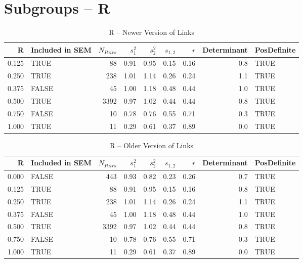 \documentclass{article}\usepackage{graphicx, color}
\begin{document}
\section{Subgroups --  R }%
\begin{table}[ht]
\begin{center}
\begin{tabular}{rlrrrrrrl}
  \hline
R & Included in SEM & $N_{Pairs}$ & $s_1^2$ & $s_2^2$ & $s_{1,2}$ & $r$ & Determinant & PosDefinite \\ 
  \hline
0.125 & TRUE & 88 & 0.91 & 0.95 & 0.15 & 0.16 & 0.8 & TRUE \\ 
  0.250 & TRUE & 238 & 1.01 & 1.14 & 0.26 & 0.24 & 1.1 & TRUE \\ 
  0.375 & FALSE & 45 & 1.00 & 1.18 & 0.48 & 0.44 & 1.0 & TRUE \\ 
  0.500 & TRUE & 3392 & 0.97 & 1.02 & 0.44 & 0.44 & 0.8 & TRUE \\ 
  0.750 & FALSE & 10 & 0.78 & 0.76 & 0.55 & 0.71 & 0.3 & TRUE \\ 
  1.000 & TRUE & 11 & 0.29 & 0.61 & 0.37 & 0.89 & 0.0 & TRUE \\ 
   \hline
\end{tabular}
\caption{R -- Newer Version of Links}
\end{center}
\end{table}
\begin{table}[ht]
\begin{center}
\begin{tabular}{rlrrrrrrl}
  \hline
R & Included in SEM & $N_{Pairs}$ & $s_1^2$ & $s_2^2$ & $s_{1,2}$ & $r$ & Determinant & PosDefinite \\ 
  \hline
0.000 & FALSE & 443 & 0.93 & 0.82 & 0.23 & 0.26 & 0.7 & TRUE \\ 
  0.125 & TRUE & 88 & 0.91 & 0.95 & 0.15 & 0.16 & 0.8 & TRUE \\ 
  0.250 & TRUE & 238 & 1.01 & 1.14 & 0.26 & 0.24 & 1.1 & TRUE \\ 
  0.375 & FALSE & 45 & 1.00 & 1.18 & 0.48 & 0.44 & 1.0 & TRUE \\ 
  0.500 & TRUE & 3392 & 0.97 & 1.02 & 0.44 & 0.44 & 0.8 & TRUE \\ 
  0.750 & FALSE & 10 & 0.78 & 0.76 & 0.55 & 0.71 & 0.3 & TRUE \\ 
  1.000 & TRUE & 11 & 0.29 & 0.61 & 0.37 & 0.89 & 0.0 & TRUE \\ 
   \hline
\end{tabular}
\caption{R -- Older Version of Links}
\end{center}
\end{table}
\newpage 
\end{document}
